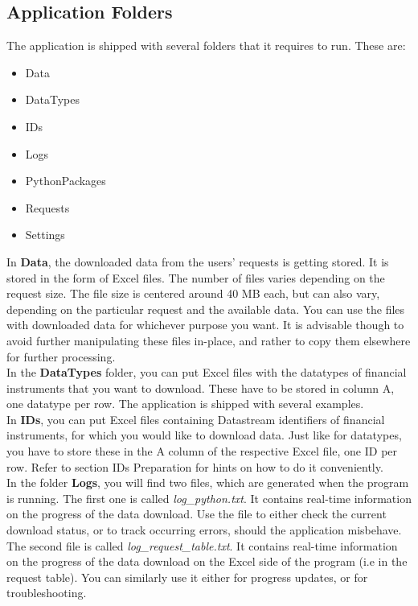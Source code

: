 \subsection{Application Folders}
The application is shipped with several folders that it requires to run. These are: 

\begin{itemize}
	\item Data
	\item DataTypes
	\item IDs
	\item Logs
	\item PythonPackages
	\item Requests
	\item Settings
\end{itemize}

In \textbf{Data}, the downloaded data from the users' requests is getting stored. It is stored in the form of Excel files. The number of files varies depending on the request size. The file size is centered around 40 MB each, but can also vary, depending on the particular request and the available data. You can use the files with downloaded data for whichever purpose you want. It is advisable though to avoid further manipulating these files in-place, and rather to copy them elsewhere for further processing. \\

In the \textbf{DataTypes} folder, you can put Excel files with the datatypes of financial instruments that you want to download. These have to be stored in column A, one datatype per row. The application is shipped with several examples. \\

In \textbf{IDs}, you can put Excel files containing Datastream identifiers of financial instruments, for which you would like to download data. Just like for datatypes, you have to store these in the A column of the respective Excel file, one ID per row. Refer to section IDs Preparation for hints on how to do it conveniently. \\

In the folder \textbf{Logs}, you will find two files, which are generated when the program is running. The first one is called \textit{log\_python.txt}. It contains real-time information on the progress of the data download. Use the file to either check the current download status, or to track occurring errors, should the application misbehave. The second file is called \textit{log\_request\_table.txt}. It contains real-time information on the progress of the data download on the Excel side of the program (i.e in the request table). You can similarly use it either for progress updates, or for troubleshooting. \\

